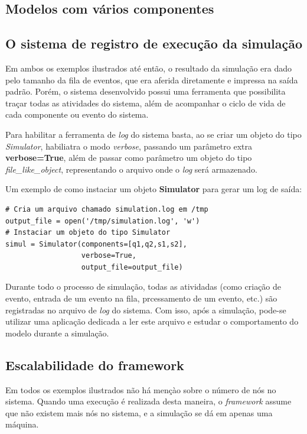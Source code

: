 \subsection{Modelos com vários componentes}

\subsection{O sistema de registro de execução da simulação}

Em ambos os exemplos ilustrados até então, o resultado da simulação era dado pelo tamanho da fila de eventos, que era aferida diretamente e impressa na saída padrão. Porém, o sistema desenvolvido possui uma ferramenta que possibilita traçar todas as atividades do sistema, além de acompanhar o ciclo de vida de cada componente ou evento do sistema.

Para habilitar a ferramenta de \textit{log} do sistema basta, ao se criar um objeto do tipo \textit{Simulator}, habiliatra o modo \textit{verbose}, passando um parâmetro extra \textbf{verbose=True}, além de passar como parâmetro um objeto do tipo \textit{file\_like\_object}, representando o arquivo onde o \textit{log} será armazenado.

Um exemplo de como instaciar um objeto \textbf{Simulator} para gerar um log de saída:

\begin{lstlisting}
# Cria um arquivo chamado simulation.log em /tmp
output_file = open('/tmp/simulation.log', 'w')
# Instaciar um objeto do tipo Simulator
simul = Simulator(components=[q1,q2,s1,s2], 
	              verbose=True, 
	              output_file=output_file)
\end{lstlisting}

Durante todo o processo de simulação, todas as atividadas (como criação de evento, entrada de um evento na fila, prcessamento de um evento, etc.) são registradas no arquivo de \textit{log} do sistema. Com isso, após a simulação, pode-se utilizar uma aplicação dedicada a ler este arquivo e estudar o comportamento do modelo durante a simulação.

\subsection{Escalabilidade do framework}

Em todos os exemplos ilustrados não há mençào sobre o número de nós no sistema. Quando uma execução é realizada desta maneira, o \textit{framework} assume que não existem mais nós no sistema, e a simulação se dá em apenas uma máquina.

